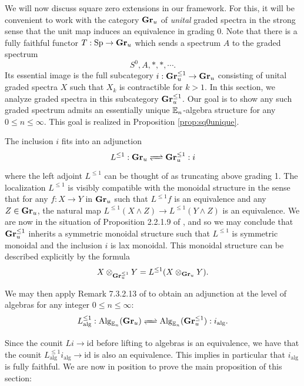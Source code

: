 
We will now discuss square zero extensions in our framework.  For this, it will be convenient to work with the category $\operatorname{\textbf{Gr}}_u$ of \emph{unital} graded spectra in the strong sense that the unit map induces an equivalence in grading 0.  
Note that there is a fully faithful functor $T:\operatorname{\text{Sp}} \to \operatorname{\textbf{Gr}}_u$ which sends a spectrum $A$ to the graded spectrum $$S^0, A, *, *, \cdots.$$  Its essential image is the full subcategory $i: \operatorname{\textbf{Gr}}^{\leq 1}_u \to \operatorname{\textbf{Gr}}_u$ consisting of unital graded spectra $X$ such that $X_k$ is contractible for $k>1$.  In this section, we analyze graded spectra in this subcategory $\operatorname{\textbf{Gr}}^{\leq 1}_u$. Our goal is to show any such graded spectrum admits an essentially unique $\operatorname{\mathbb{E}}_n$-algebra structure for any $0\leq n\leq \infty.$  This goal is realized in Proposition \ref{prop:sq0unique}.  


The inclusion $i$ fits into an adjunction
$$L^{\leq 1}:  \Gr_u \xrightleftharpoons{\quad} \Gr_u^{\leq 1} : i$$ where the left adjoint $L^{\leq 1}$ can be thought of as truncating above grading 1.  The localization $L^{\leq 1}$ is visibly compatible with the monoidal structure in the sense that for any $f:X\to Y$ in $\operatorname{\textbf{Gr}}_u$ such that $L^{\leq 1}f$ is an equivalence and any $Z\in \operatorname{\textbf{Gr}}_u$, the natural map $L^{\leq 1} (X\wedge Z) \to L^{\leq 1}(Y\wedge Z)$ is an equivalence.  We are now in the situation of Proposition 2.2.1.9 of \cite{HA}, and so we may conclude that $\operatorname{\textbf{Gr}}_u^{\leq 1}$ inherits a symmetric monoidal structure such that $L^{\leq 1}$ is symmetric monoidal and the inclusion $i$ is lax monoidal.  This monoidal structure can be described explicitly by the formula $$X \otimes_{\operatorname{\textbf{Gr}}_u^{\leq 1}} Y = L^{\leq 1}(X \otimes_{\operatorname{\textbf{Gr}}_u} Y).$$

We may then apply Remark 7.3.2.13 of \cite{HA} to obtain an adjunction at the level of algebras for any integer $0\leq n\leq \infty$:
$$L^{\leq 1}_{\text{alg}}: \Alg_{\E_n}( \Gr_u)  \xrightleftharpoons{\quad} \Alg_{\E_n}(\Gr_u^{\leq 1}) : i_{\text{alg}}.$$

Since the counit $Li \to \text{id}$ before lifting to algebras is an equivalence, we have that the counit $L^{\leq 1}_{\text{alg}}  i_{\text{alg}} \to \text{id}$ is also an equivalence.  This implies in particular that $i_{\text{alg}}$ is fully faithful.  We are now in position to prove the main proposition of this section:

